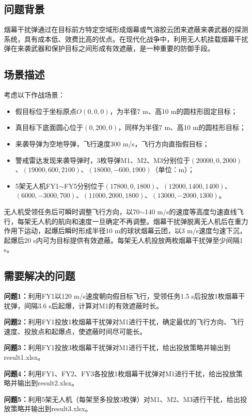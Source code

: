 
\subsection{问题背景}

烟幕干扰弹通过在目标前方特定空域形成烟幕或气溶胶云团来遮蔽来袭武器的探测系统，具有成本低、效费比高的优点。在现代化战争中，利用无人机挂载烟幕干扰弹在来袭武器和保护目标之间形成有效遮蔽，是一种重要的防御手段。

\subsection{场景描述}

考虑以下作战场景：
\begin{itemize}
    \item 假目标位于坐标原点$O(0,0,0)$，为半径7 m、高10 m的圆柱形固定目标；
    \item 真目标下底面圆心位于$(0,200,0)$，同样为半径7 m、高10 m的圆柱形目标；
    \item 来袭导弹为空地导弹，飞行速度300 m/s，飞行方向直指假目标；
    \item 警戒雷达发现来袭导弹时，3枚导弹M1、M2、M3分别位于$(20000,0,2000)$、$(19000,600,2100)$、$(18000,-600,1900)$（单位：m）；
    \item 5架无人机FY1$\sim$FY5分别位于$(17800,0,1800)$、$(12000,1400,1400)$、$(6000,-3000,700)$、$(11000,2000,1800)$、$(13000,-2000,1300)$。
\end{itemize}

无人机受领任务后可瞬时调整飞行方向，以70$\sim$140 m/s的速度等高度匀速直线飞行，每架无人机的航向和速度一旦确定不再调整。烟幕干扰弹脱离无人机后在重力作用下运动，起爆后瞬时形成半径10 m的球状烟幕云团，以3 m/s速度匀速下沉，起爆后20 s内可为目标提供有效遮蔽。每架无人机投放两枚烟幕干扰弹至少间隔1 s。

\subsection{需要解决的问题}

\textbf{问题1：}利用FY1以120 m/s速度朝向假目标飞行，受领任务1.5 s后投放1枚烟幕干扰弹，间隔3.6 s后起爆，计算对M1的有效遮蔽时长。

\textbf{问题2：}利用FY1投放1枚烟幕干扰弹对M1进行干扰，确定最优的飞行方向、飞行速度、投放点和起爆点，使遮蔽时间尽可能长。

\textbf{问题3：}利用FY1投放3枚烟幕干扰弹对M1进行干扰，给出投放策略并输出到result1.xlsx。

\textbf{问题4：}利用FY1、FY2、FY3各投放1枚烟幕干扰弹对M1进行干扰，给出投放策略并输出到result2.xlsx。

\textbf{问题5：}利用5架无人机（每架至多投放3枚弹）对M1、M2、M3进行干扰，给出投放策略并输出到result3.xlsx。
